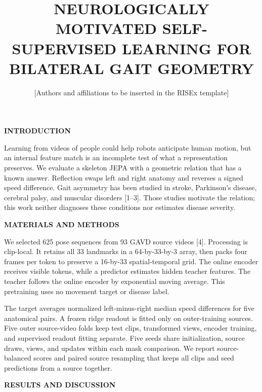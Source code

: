 \documentclass[11pt,letterpaper]{article}
\title{\vspace{-1.2em}\textbf{\MakeUppercase{Neurologically Motivated
Self-Supervised Learning for Bilateral Gait Geometry}}\vspace{-0.5em}}
\author{\normalsize [Authors and affiliations to be inserted in the RISEx template]}
\date{}
\renewcommand{\subsection}[1]{\vspace{2pt}\noindent\textbf{#1}\par\vspace{1pt}}
\begin{document}
\twocolumn[
  \begin{@twocolumnfalse}
  \maketitle
  \vspace{-1.1em}
  \end{@twocolumnfalse}
]
\subsection{INTRODUCTION}\label{introduction}

Learning from videos of people could help robots anticipate human
motion, but an internal feature match is an incomplete test of what a
representation preserves. We evaluate a skeleton JEPA with a geometric
relation that has a known answer. Reflection swaps left and right
anatomy and reverses a signed speed difference. Gait asymmetry has been
studied in stroke, Parkinson's disease, cerebral palsy, and muscular
disorders {[}1--3{]}. Those studies motivate the relation; this work
neither diagnoses these conditions nor estimates disease severity.

\subsection{MATERIALS AND METHODS}\label{materials-and-methods}

We selected 625 pose sequences from 93 GAVD source videos {[}4{]}.
Processing is clip-local. It retains all 33 landmarks in a 64-by-33-by-3
array, then packs four frames per token to preserve a 16-by-33
spatial-temporal grid. The online encoder receives visible tokens, while
a predictor estimates hidden teacher features. The teacher follows the
online encoder by exponential moving average. This pretraining uses no
movement target or disease label.

The target averages normalized left-minus-right median speed differences
for five anatomical pairs. A frozen ridge readout is fitted only on
outer-training sources. Five outer source-video folds keep test clips,
transformed views, encoder training, and supervised readout fitting
separate. Five seeds share initialization, source draws, views, and
updates within each mask comparison. We report source-balanced scores
and paired source resampling that keeps all clips and seed predictions
from a source together.

\subsection{RESULTS AND DISCUSSION}\label{results-and-discussion}
\end{document}
